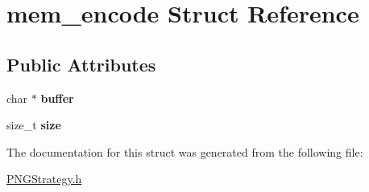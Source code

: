 \hypertarget{structmem__encode}{\section{mem\+\_\+encode Struct Reference}
\label{structmem__encode}
}
\subsection*{Public Attributes}
\begin{DoxyCompactItemize}
\item 
\hypertarget{structmem__encode_a70f5426618e93ea6cb7259e8df552610}{char $\ast$ {\bfseries buffer}}\label{structmem__encode_a70f5426618e93ea6cb7259e8df552610}

\item 
\hypertarget{structmem__encode_adfd242fbd7f1bed163deaa6912f21081}{size\+\_\+t {\bfseries size}}\label{structmem__encode_adfd242fbd7f1bed163deaa6912f21081}

\end{DoxyCompactItemize}


The documentation for this struct was generated from the following file\+:\begin{DoxyCompactItemize}
\item 
\hyperlink{_p_n_g_strategy_8h}{P\+N\+G\+Strategy.\+h}\end{DoxyCompactItemize}
